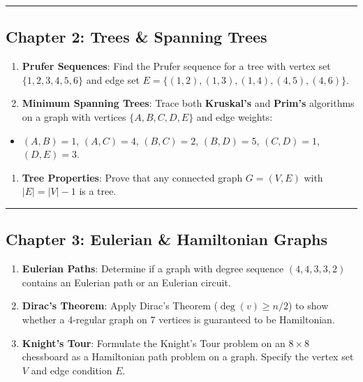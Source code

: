 \documentclass[
]{book}
\providecommand{\tightlist}{%
  \setlength{\itemsep}{0pt}\setlength{\parskip}{0pt}}
\theoremstyle{definition}
\theoremstyle{definition}
\theoremstyle{definition}
\theoremstyle{definition}
\theoremstyle{remark}
\begin{document}
\begin{center}\rule{0.5\linewidth}{0.5pt}\end{center}

\subsection{Chapter 2: Trees \& Spanning Trees}\label{chapter-2-trees-spanning-trees}

\begin{enumerate}
\def\labelenumi{\arabic{enumi}.}
\tightlist
\item
  \textbf{Prufer Sequences}: Find the Prufer sequence for a tree with vertex set \(\{1, 2, 3, 4, 5, 6\}\) and edge set \(E = \{(1, 2), (1, 3), (1, 4), (4, 5), (4, 6)\}\).
\item
  \textbf{Minimum Spanning Trees}: Trace both \textbf{Kruskal's} and \textbf{Prim's} algorithms on a graph with vertices \(\{A, B, C, D, E\}\) and edge weights:
\end{enumerate}

\begin{itemize}
\tightlist
\item
  \((A, B) = 1\), \((A, C) = 4\), \((B, C) = 2\), \((B, D) = 5\), \((C, D) = 1\), \((D, E) = 3\).
\end{itemize}

\begin{enumerate}
\def\labelenumi{\arabic{enumi}.}
\setcounter{enumi}{2}
\tightlist
\item
  \textbf{Tree Properties}: Prove that any connected graph \(G = (V, E)\) with \(\vert{}E\vert{} = \vert{}V\vert{} - 1\) is a tree.
\end{enumerate}

\begin{center}\rule{0.5\linewidth}{0.5pt}\end{center}

\subsection{Chapter 3: Eulerian \& Hamiltonian Graphs}\label{chapter-3-eulerian-hamiltonian-graphs}

\begin{enumerate}
\def\labelenumi{\arabic{enumi}.}
\tightlist
\item
  \textbf{Eulerian Paths}: Determine if a graph with degree sequence \((4, 4, 3, 3, 2)\) contains an Eulerian path or an Eulerian circuit.
\item
  \textbf{Dirac's Theorem}: Apply Dirac's Theorem (\(\deg(v) \ge n/2\)) to show whether a 4-regular graph on 7 vertices is guaranteed to be Hamiltonian.
\item
  \textbf{Knight's Tour}: Formulate the Knight's Tour problem on an \(8 \times 8\) chessboard as a Hamiltonian path problem on a graph. Specify the vertex set \(V\) and edge condition \(E\).
\end{enumerate}
\end{document}
